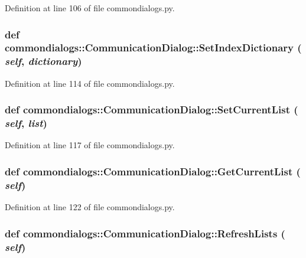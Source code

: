 Definition at line 106 of file commondialogs.py.\hypertarget{classcommondialogs_1_1CommunicationDialog_fd58f80e7851c8b2254930aa0ea13a2c}{
\subsubsection[SetIndexDictionary]{\setlength{\rightskip}{0pt plus 5cm}def commondialogs::Communication\-Dialog::Set\-Index\-Dictionary ( {\em self},  {\em dictionary})}}
\label{classcommondialogs_1_1CommunicationDialog_fd58f80e7851c8b2254930aa0ea13a2c}




Definition at line 114 of file commondialogs.py.\hypertarget{classcommondialogs_1_1CommunicationDialog_42954cf3c548eaeccf2a6ae5793b12ca}{
\subsubsection[SetCurrentList]{\setlength{\rightskip}{0pt plus 5cm}def commondialogs::Communication\-Dialog::Set\-Current\-List ( {\em self},  {\em list})}}
\label{classcommondialogs_1_1CommunicationDialog_42954cf3c548eaeccf2a6ae5793b12ca}




Definition at line 117 of file commondialogs.py.\hypertarget{classcommondialogs_1_1CommunicationDialog_ff2dfb0c00ca27c85c297ae134ea4f31}{
\subsubsection[GetCurrentList]{\setlength{\rightskip}{0pt plus 5cm}def commondialogs::Communication\-Dialog::Get\-Current\-List ( {\em self})}}
\label{classcommondialogs_1_1CommunicationDialog_ff2dfb0c00ca27c85c297ae134ea4f31}




Definition at line 122 of file commondialogs.py.\hypertarget{classcommondialogs_1_1CommunicationDialog_4d1850143516dddd4a997068f8d39707}{
\subsubsection[RefreshLists]{\setlength{\rightskip}{0pt plus 5cm}def commondialogs::Communication\-Dialog::Refresh\-Lists ( {\em self})}}
\label{classcommondialogs_1_1CommunicationDialog_4d1850143516dddd4a997068f8d39707}




